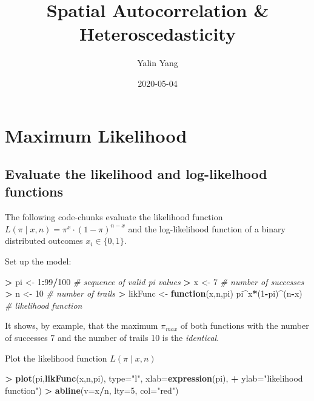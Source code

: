 \documentclass[
]{article}
\title{Spatial Autocorrelation \& Heteroscedasticity}
\author{Yalin Yang}
\date{2020-05-04}
\newenvironment{Shaded}{\begin{snugshade}}{\end{snugshade}}
\newcommand{\CommentTok}[1]{\textcolor[rgb]{0.56,0.35,0.01}{\textit{#1}}}
\newcommand{\ControlFlowTok}[1]{\textcolor[rgb]{0.13,0.29,0.53}{\textbf{#1}}}
\newcommand{\DataTypeTok}[1]{\textcolor[rgb]{0.13,0.29,0.53}{#1}}
\newcommand{\DecValTok}[1]{\textcolor[rgb]{0.00,0.00,0.81}{#1}}
\newcommand{\KeywordTok}[1]{\textcolor[rgb]{0.13,0.29,0.53}{\textbf{#1}}}
\newcommand{\NormalTok}[1]{#1}
\newcommand{\OperatorTok}[1]{\textcolor[rgb]{0.81,0.36,0.00}{\textbf{#1}}}
\newcommand{\StringTok}[1]{\textcolor[rgb]{0.31,0.60,0.02}{#1}}
\begin{document}
\maketitle

{
\setcounter{tocdepth}{3}
\tableofcontents
}
\hypertarget{maximum-likelihood}{%
\section{Maximum Likelihood}\label{maximum-likelihood}}

\hypertarget{evaluate-the-likelihood-and-log-likelhood-functions}{%
\subsection{Evaluate the likelihood and log-likelhood
functions}\label{evaluate-the-likelihood-and-log-likelhood-functions}}

The following code-chunks evaluate the likelihood function
\(L(\pi \mid x,n)=\pi^x \cdot (1-\pi)^{n-x}\) and the log-likelihood
function of a binary distributed outcomes \(x_i \in \{0,1\}\).

Set up the model:

\begin{Shaded}
\begin{Highlighting}[]
\OperatorTok{>}\StringTok{ }\NormalTok{pi <-}\StringTok{ }\DecValTok{1}\OperatorTok{:}\DecValTok{99}\OperatorTok{/}\DecValTok{100}                                 \CommentTok{# sequence of valid pi values}
\OperatorTok{>}\StringTok{ }\NormalTok{x <-}\StringTok{ }\DecValTok{7}                                         \CommentTok{# number of successes}
\OperatorTok{>}\StringTok{ }\NormalTok{n <-}\StringTok{ }\DecValTok{10}                                        \CommentTok{# number of trails}
\OperatorTok{>}\StringTok{ }\NormalTok{likFunc <-}\StringTok{ }\ControlFlowTok{function}\NormalTok{(x,n,pi) pi}\OperatorTok{^}\NormalTok{x}\OperatorTok{*}\NormalTok{(}\DecValTok{1}\OperatorTok{-}\NormalTok{pi)}\OperatorTok{^}\NormalTok{(n}\OperatorTok{-}\NormalTok{x)  }\CommentTok{# likelihood function}
\end{Highlighting}
\end{Shaded}

It shows, by example, that the maximum \(\pi_{max}\) of both functions
with the number of successes 7 and the number of trails 10 is the
\emph{identical}.

Plot the likelihood function \(L(\pi \mid x,n)\)

\begin{Shaded}
\begin{Highlighting}[]
\OperatorTok{>}\StringTok{ }\KeywordTok{plot}\NormalTok{(pi,}\KeywordTok{likFunc}\NormalTok{(x,n,pi), }\DataTypeTok{type=}\StringTok{"l"}\NormalTok{, }\DataTypeTok{xlab=}\KeywordTok{expression}\NormalTok{(pi), }
\OperatorTok{+}\StringTok{      }\DataTypeTok{ylab=}\StringTok{"likelihood function"}\NormalTok{)}
\OperatorTok{>}\StringTok{ }\KeywordTok{abline}\NormalTok{(}\DataTypeTok{v=}\NormalTok{x}\OperatorTok{/}\NormalTok{n, }\DataTypeTok{lty=}\DecValTok{5}\NormalTok{, }\DataTypeTok{col=}\StringTok{"red"}\NormalTok{)}
\end{Highlighting}
\end{Shaded}
\end{document}
